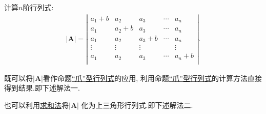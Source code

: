 \documentclass[../../main.tex]{subfiles}%
\begin{document}
\begin{example}
计算$n$阶行列式:
\begin{equation}
\begin{split}
|\boldsymbol{A}|=\left| \begin{matrix}
a_1+b&		a_2&		a_3&		\cdots&		a_n\\
a_1&		a_2+b&		a_3&		\cdots&		a_n\\
a_1&		a_2&		a_3+b&		\cdots&		a_n\\
\vdots&		\vdots&		\vdots&		&		\vdots\\
a_1&		a_2&		a_3&		\cdots&		a_n+b\\
\end{matrix} \right|.
\end{split}
\nonumber
\end{equation}
\begin{note}
既可以将$|\boldsymbol{A}|$看作命题\hyperref[proposition:爪型行列式]{“爪”型行列式}的应用,
利用命题\hyperref[proposition:爪型行列式]{“爪”型行列式}的计算方法直接得到结果.即下述解法一.

也可以利用\hyperlink{行列式计算:求和法}{求和法}将$|\boldsymbol{A}|$
化为上三角形行列式.即下述解法二.
\end{note}
\begin{solution}


\end{solution}
\end{example}
\end{document}
